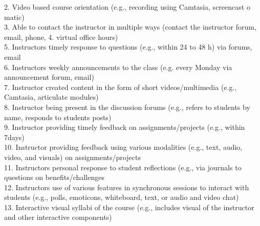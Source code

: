 2. Video based course orientation (e.g., recording using Camtasia, screencast o matic)\\
3. Able to contact the instructor in multiple ways (contact the instructor forum, email, phone, 4. virtual office hours)\\
5. Instructors timely response to questions (e.g., within 24 to 48 h) via forums, email\\
6. Instructors weekly announcements to the class (e.g. every Monday via announcement forum, email)\\
7. Instructor created content in the form of short videos/multimedia (e.g., Camtasia, articulate modules)\\
8. Instructor being present in the discussion forums (e.g., refers to students by name, responds to students posts)\\
9. Instructor providing timely feedback on assignments/projects (e.g., within 7days)\\
10. Instructor providing feedback using various modalities (e.g., text, audio, video, and visuals) on assignments/projects\\
11. Instructors personal response to student reflections (e.g., via journals to questions on benefits/challenges\\
12. Instructors use of various features in synchronous sessions to interact with students (e.g., polls, emoticons, whiteboard, text, or audio and video chat)\\
13. Interactive visual syllabi of the course (e.g., includes visual of the instructor and other interactive components)\cite{Martin2018}\\
